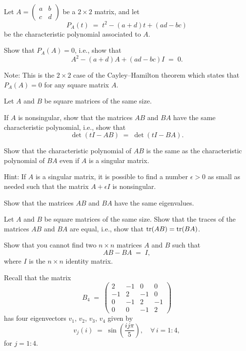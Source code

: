\begin{exercises}
\item Let $A = \begin{pmatrix} a & b\\ c & d \end{pmatrix}$ be a $2 \times 2$
matrix, and let
\[
P_A(t) \;=\; t^2 - (a+d)t + (ad-bc)
\]
be the characteristic polynomial associated to $A$.

Show that $P_A(A) = 0$, i.e., show that
\[
A^2 - (a+d)A + (ad-bc)I \;=\; 0.
\]

\noindent Note: This is the $2 \times 2$ case of the Cayley--Hamilton
theorem which states that $P_A(A) = 0$ for any square matrix $A$.

\item Let $A$ and $B$ be square matrices of the same size.
\begin{subparts}
\item If $A$ is nonsingular, show that the matrices $AB$ and $BA$ have the
same characteristic polynomial, i.e., show that
\[
\det(tI - AB) \;=\; \det(tI - BA).
\]
\item Show that the characteristic polynomial of $AB$ is the same as the
characteristic polynomial of $BA$ even if $A$ is a singular matrix.

\noindent Hint: If $A$ is a singular matrix, it is possible to find a number
$\epsilon > 0$ as small as needed such that the matrix $A + \epsilon I$ is
nonsingular.
\item Show that the matrices $AB$ and $BA$ have the same eigenvalues.
\end{subparts}

\item
\begin{subparts}
\item Let $A$ and $B$ be square matrices of the same size. Show that the
traces of the matrices $AB$ and $BA$ are equal, i.e., show that $\operatorname{tr}(AB) =
\operatorname{tr}(BA)$.
\item Show that you cannot find two $n \times n$ matrices $A$ and $B$ such
that
\[
AB - BA \;=\; I,
\]
where $I$ is the $n \times n$ identity matrix.
\end{subparts}

\item Recall that the matrix
\[
B_4 \;=\; \begin{pmatrix} 2 & -1 & 0 & 0\\ -1 & 2 & -1 & 0\\ 0 & -1 & 2 & -1\\ 0 & 0 & -1 & 2 \end{pmatrix}
\]
has four eigenvectors $v_1$, $v_2$, $v_3$, $v_4$ given by
\[
v_j(i) \;=\; \sin\left(\frac{ij\pi}{5}\right), \quad \forall\, i = 1:4,
\]
for $j = 1:4$.


\end{exercises}
